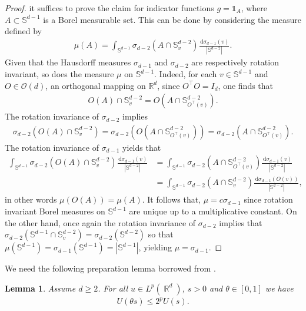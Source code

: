 \documentclass[12pt, reqno]{amsart}%
\theoremstyle{plain}  %
\newtheorem{lemma}[theorem]{Lemma}
\theoremstyle{definition}  %
\theoremstyle{remark}
\numberwithin{equation}{section}
\DeclareMathOperator{\R}{\mathbb{R}}
\renewcommand{\d}{\,\mathrm{d}}
\begin{document}
\begin{proof}
it suffices to prove the claim for indicator functions
$g = \mathds{1}_A$, where  $A \subset \mathbb{S}^{d-1} $ is a Borel measurable set. This can be done by considering the measure defined by
\begin{align*}
\mu(A)=  \int_{\mathbb{S}^{d-1}} \sigma_{d-2}(A\cap  \mathbb{S}^{d-2}_v ) \frac{ \d \sigma_{d-1}(v)}{|\mathbb{S}^{d-2}|}.
\end{align*}
Given that the Hausdorff measures $\sigma_{d-1}$ and $\sigma_{d-2}$ are respectively rotation invariant, so does the measure $\mu$ on $\mathbb{S}^{d-1}$. Indeed, for each $v\in \mathbb{S}^{d-1}$ and $O\in \mathcal{O}(d)$, an orthogonal mapping on $\mathbb{R}^d$, since $O^\top  O= I_d$, one finds that
\begin{align*}
O(A) \cap  \mathbb{S}^{d-2}_v  = O(A \cap  \mathbb{S}^{d-2}_{O^\top (v)}).
\end{align*}
The rotation invariance of $\sigma_{d-2}$ implies
%
\begin{align*}
\sigma_{d-2}(O(A)\cap  \mathbb{S}^{d-2}_v ) = \sigma_{d-2}(O(A\cap  \mathbb{S}^{d-2}_{O^\top (v)})) = \sigma_{d-2}(A\cap  \mathbb{S}^{d-2}_{O^\top (v)}).
\end{align*}
The rotation invariance of $\sigma_{d-1}$ yields that
\begin{align*}
\int_{\mathbb{S}^{d-1}} \sigma_{d-2}(O(A)\cap  \mathbb{S}^{d-2}_v ) \frac{ \d \sigma_{d-1}(v)}{|\mathbb{S}^{d-2}|} &=  \int_{\mathbb{S}^{d-1}} \sigma_{d-2}(A\cap  \mathbb{S}^{d-2}_{O^\top (v)}) \frac{ \d \sigma_{d-1}(v)}{|\mathbb{S}^{d-2}|}\\
&=     \int_{\mathbb{S}^{d-1}} \sigma_{d-2}(A\cap  \mathbb{S}^{d-2}_{v}) \frac{ \d \sigma_{d-1}(O(v))}{|\mathbb{S}^{d-2}|},
\end{align*}
%
in other words $\mu(O(A)) =  \mu(A) $. It follows that, $\mu= c\sigma_{d-1}$ since rotation invariant Borel measures on $\mathbb{S}^{d-1} $ are unique up to a multiplicative constant.  On the other hand, once again the rotation invariance of $\sigma_{d-2}$ implies that $\sigma_{d-2}(\mathbb{S}^{d-1}\cap \mathbb{S}^{d-2}_v)  =  \sigma_{d-2}(\mathbb{S}^{d-2})$ so  that $\mu(\mathbb{S}^{d-1})= \sigma_{d-1} (\mathbb{S}^{d-1}) =|\mathbb{S}^{d-1}|$, yielding  $\mu= \sigma_{d-1}$.
\end{proof}

We need the following preparation lemma borrowed from \cite{Pon04}.

\begin{lemma}\label{lem:lp-diff-growth-spher}  Assume $d\geq 2$. For all $u\in L^p(\R^d)$, $s>0$ and $\theta\in [0,1]$ we have
\begin{align*}
U(\theta s)\leq 2^pU(s).
\end{align*}
\end{lemma}
\end{document}
